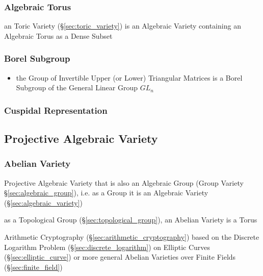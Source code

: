 \subsubsection{Algebraic Torus}\label{sec:algebraic_torus}

an Toric Variety (\S\ref{sec:toric_variety}) is an Algebraic Variety containing
an Algebraic Torus as a Dense Subset



\subsubsection{Borel Subgroup}\label{sec:borel_subgroup}

\begin{itemize}
  \item the Group of Invertible Upper (or Lower) Triangular Matrices is a Borel
    Subgroup of the General Linear Group $GL_n$
\end{itemize}



\subsubsection{Cuspidal Representation}\label{sec:cuspidal_representation}



\subsection{Projective Algebraic Variety}
\label{sec:projective_algebraic_variety}

\subsubsection{Abelian Variety}\label{sec:abelian_variety}

Projective Algebraic Variety that is also an Algebraic Group (Group Variety
\S\ref{sec:algebraic_group}), i.e. as a Group it is an Algebraic Variety
(\S\ref{sec:algebraic_variety})

as a Topological Group (\S\ref{sec:topological_group}), an Abelian Variety is a
Torus %

\fist Arithmetic Cryptography (\S\ref{sec:arithmetic_cryptography}) based on
the Discrete Logarithm Problem (\S\ref{sec:discrete_logarithm}) on Elliptic
Curves (\S\ref{sec:elliptic_curve}) or more general Abelian Varieties over
Finite Fields (\S\ref{sec:finite_field})




